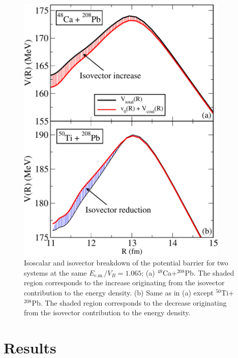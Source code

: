 \begin{figure}
	\centering
	\includegraphics*[width=0.9\textwidth]{../Figures/Isospin/V_CaTi_Pb_stack_2.pdf}
	\caption{Isoscalar and isovector breakdown of the potential barrier for two
		systems at the same $E_\mathrm{c.m.}/V_B=1.065$;
		(a) $^{48}$Ca+$^{208}$Pb. The shaded region corresponds to the increase originating
		from the isovector contribution to
		the energy density.
		(b) Same as in (a) except $^{50}$Ti+$^{208}$Pb.
		The shaded region corresponds to the decrease originating from the isovector contribution to
		the energy density.}
	\label{fig:CaTi_Pb}
\end{figure}

\section{Results}

